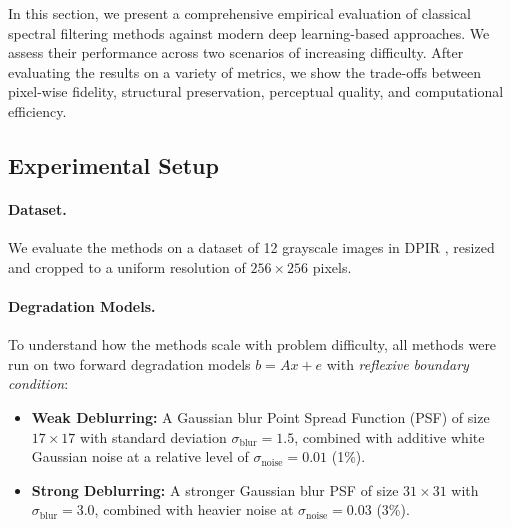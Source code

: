 \documentclass[12pt, a4paper, onecolumn]{article}
\theoremstyle{plain}          %
\theoremstyle{definition}     %
\theoremstyle{remark}
\begin{document}
In this section, we present a comprehensive empirical evaluation of classical spectral filtering methods against modern deep learning-based approaches. We assess their performance across two scenarios of increasing difficulty. After evaluating the results on a variety of metrics, we show the trade-offs between pixel-wise fidelity, structural preservation, perceptual quality, and computational efficiency.

\subsection{Experimental Setup}
\label{sec:exp_setup}

\paragraph{Dataset.} 
We evaluate the methods on a dataset of 12 grayscale images in DPIR \cite{dpir2021}, resized and cropped to a uniform resolution of $256 \times 256$ pixels. 

\paragraph{Degradation Models.}
To understand how the methods scale with problem difficulty, all methods were run on two forward degradation models $b = Ax + e$ with \textit{reflexive boundary condition}:
\begin{itemize}
    \item \textbf{Weak Deblurring:} A Gaussian blur Point Spread Function (PSF) of size $17 \times 17$ with standard deviation $\sigma_{\text{blur}} = 1.5$, combined with additive white Gaussian noise at a relative level of $\sigma_{\text{noise}} = 0.01$ (1\%).
    \item \textbf{Strong Deblurring:} A stronger Gaussian blur PSF of size $31 \times 31$ with $\sigma_{\text{blur}} = 3.0$, combined with heavier noise at $\sigma_{\text{noise}} = 0.03$ (3\%).
\end{itemize}
\end{document}
